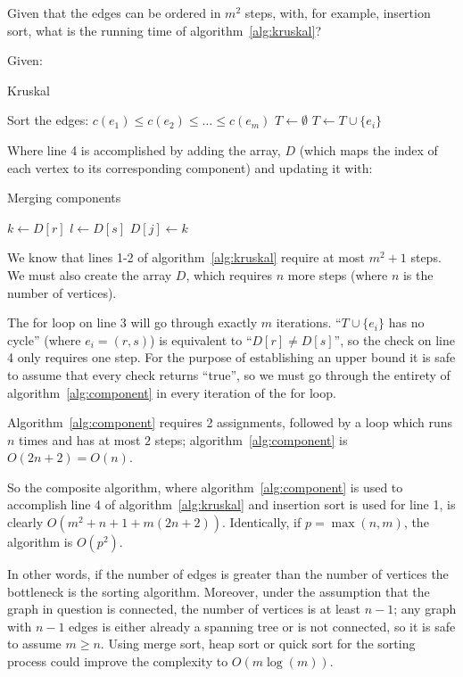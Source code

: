 \documentclass{article}
\newenvironment{prb}[1]
	{\renewcommand\theinner{#1}\inner}
	{\endinner}
\begin{document}
\begin{prb}{2.5}
Given that the edges can be ordered in $m^2$ steps, with, for example,
insertion sort, what is the running time of
algorithm~\ref{alg:kruskal}?
\end{prb}

\noindent Given:
\begin{algorithm}
\caption{Kruskal}%
\label{alg:kruskal}%
\begin{algorithmic}[1]
\STATE Sort the edges: $c(e_1)\leq c(e_2)\leq\ldots\leq c(e_m)$ 
\STATE $T\longleftarrow\emptyset$ 
        \STATE $T\longleftarrow T\cup\{e_i\}$
    \ENDIF
\ENDFOR
\end{algorithmic}
\end{algorithm}

\noindent Where line 4 is accomplished by adding the array, $D$
(which maps the index of each vertex to its corresponding component)
and updating it with:

\begin{algorithm}
\caption{Merging components}%
\label{alg:component}%
\begin{algorithmic}
\STATE $k\longleftarrow D[r]$ 
\STATE $l\longleftarrow D[s]$ 
        \STATE $D[j]\longleftarrow k$
     \ENDIF
\ENDFOR
\end{algorithmic}
\end{algorithm}

\break
We know that lines 1-2 of algorithm~\ref{alg:kruskal} require at most 
$m^2+1$ steps. We must also create the array $D$, which requires $n$
more steps (where $n$ is the number of vertices). 

The for loop on line 3 will go through exactly $m$ 
iterations. 
``$T\cup\{e_i\}$ has no cycle'' (where $e_i=(r,s)$) is equivalent to 
``$D[r]\neq D[s]$'', so the check on line 4 only requires one step. 
For the purpose of establishing an upper bound it is safe to assume 
that every check  returns ``true'', so we must go through the entirety 
of  algorithm~\ref{alg:component} in every iteration of the for loop. 

Algorithm~\ref{alg:component} requires 2 assignments, followed by a loop
which runs $n$ times and has at most
$2$ steps; algorithm~\ref{alg:component} is $O(2n+2)=O(n)$.

So the composite algorithm, where algorithm~\ref{alg:component} 
is used to accomplish line 4 of algorithm~\ref{alg:kruskal} and 
insertion sort is used for line 1, is clearly $O(m^2+n+1+m(2n+2))$.
Identically, if $p=\max(n,m)$, the algorithm is $O(p^2)$. 

In other words, if the number of edges is greater than the number of
vertices the bottleneck is the sorting algorithm. Moreover, under the
assumption that the graph in question is connected, the number of vertices
is at least $n-1$; any graph with $n-1$ edges is either already a spanning
tree or is not connected, so it is safe to assume $m\ge n$.
Using merge sort, heap sort or quick sort for the 
sorting process could improve the complexity to $O(m\log(m))$.
\end{document}
